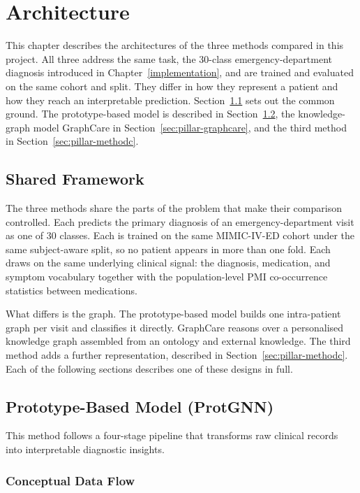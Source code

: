 \chapter{Architecture}\label{architecture}
This chapter describes the architectures of the three methods compared in this project. All three address the same task, the 30-class emergency-department diagnosis introduced in Chapter~\ref{implementation}, and are trained and evaluated on the same cohort and split. They differ in how they represent a patient and how they reach an interpretable prediction. Section~\ref{sec:shared-framework} sets out the common ground. The prototype-based model is described in Section~\ref{sec:pillar-protgnn}, the knowledge-graph model GraphCare in Section~\ref{sec:pillar-graphcare}, and the third method in Section~\ref{sec:pillar-methodc}.

\section{Shared Framework}\label{sec:shared-framework}
The three methods share the parts of the problem that make their comparison controlled. Each predicts the primary diagnosis of an emergency-department visit as one of 30 classes. Each is trained on the same MIMIC-IV-ED cohort under the same subject-aware split, so no patient appears in more than one fold. Each draws on the same underlying clinical signal: the diagnosis, medication, and symptom vocabulary together with the population-level PMI co-occurrence statistics between medications.

What differs is the graph. The prototype-based model builds one intra-patient graph per visit and classifies it directly. GraphCare reasons over a personalised knowledge graph assembled from an ontology and external knowledge. The third method adds a further representation, described in Section~\ref{sec:pillar-methodc}. Each of the following sections describes one of these designs in full.

\section{Prototype-Based Model (ProtGNN)}\label{sec:pillar-protgnn}
This method follows a four-stage pipeline that transforms raw clinical records into interpretable diagnostic insights.

\subsection{Conceptual Data Flow}

